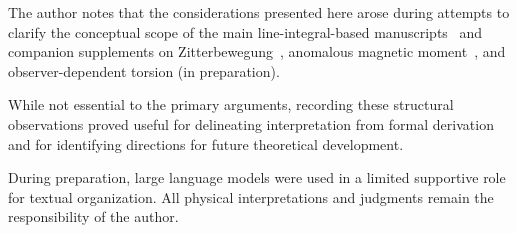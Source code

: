\documentclass[12pt,letterpaper]{article}
\begin{document}
The author notes that the considerations presented here arose during attempts to clarify the conceptual scope of the main line-integral-based manuscripts~\cite{hanamura18067760,hanamura18135855,hanamura18203433} and companion supplements on Zitterbewegung~\cite{hanamura18356895}, anomalous magnetic moment~\cite{hanamura18511664}, and observer-dependent torsion (in preparation).

While not essential to the primary arguments, recording these structural observations proved useful for delineating interpretation from formal derivation and for identifying directions for future theoretical development.

During preparation, large language models were used in a limited supportive role for textual organization. All physical interpretations and judgments remain the responsibility of the author.
\end{document}
